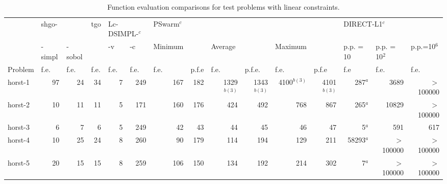 \setlength{\tabcolsep}{5.5pt}
\begin{landscape}
\begin{table}[htbp]
\caption{Function evaluation comparisons for test problems with linear constraints. }%
\begin{tabular}{lrrrrrrrrrrrrrr}
\toprule
 & \multicolumn{1}{l}{shgo-}  & \multicolumn{1}{l}{} & \multicolumn{1}{l}{tgo}  & \multicolumn{2}{l}{Lc-DSIMPL-$^c$}   & \multicolumn{1}{l}{PSwarm$^c$} & \multicolumn{1}{l}{} & \multicolumn{1}{l}{} & \multicolumn{1}{l}{}  & \multicolumn{1}{l}{} & \multicolumn{1}{l}{} & \multicolumn{2}{l}{DIRECT-L1$^c$}  &  \\  \cmidrule(lr){7-12}
 & \multicolumn{1}{l}{-simpl}  & \multicolumn{1}{l}{-sobol} & \multicolumn{1}{l}{}  & \multicolumn{1}{l}{-v} & \multicolumn{1}{l}{-c} & \multicolumn{1}{l}{Minimum} & \multicolumn{1}{l}{} & \multicolumn{1}{l}{Average} & \multicolumn{1}{l}{} & \multicolumn{1}{l}{Maximum} & \multicolumn{1}{l}{} & \multicolumn{1}{l}{p.p. = 10} & \multicolumn{1}{l}{p.p. = 10$^2$} & \multicolumn{1}{l}{p.p.=10$^6$} \\  \cmidrule(lr){2-3} \cmidrule(lr){4-4}  \cmidrule(lr){5-6} \cmidrule(lr){7-8} \cmidrule(lr){9-10} \cmidrule(lr){11-12}  \cmidrule(lr){13-15}
Problem & \multicolumn{1}{l}{f.e.} & \multicolumn{1}{l}{f.e.} & \multicolumn{1}{l}{f.e.} & \multicolumn{1}{l}{f.e.} & \multicolumn{1}{l}{f.e.} & \multicolumn{1}{l}{f.e.} & \multicolumn{1}{l}{p.f.e} & \multicolumn{1}{l}{f.e.} & \multicolumn{1}{l}{p.f.e.} & \multicolumn{1}{l}{f.e.} & \multicolumn{1}{l}{p.f.e} & \multicolumn{1}{l}{f.e} & \multicolumn{1}{l}{f.e.} & \multicolumn{1}{l}{f.e.} \\ 
\midrule
horst-1  & 97 & 24 & 34 & 7 & 249 & 167 & 182 & 1329$^{b(3)}$ & 1343$^{b(3)}$ & 4100$^{b(3)}$ & 4101$^{b(3)}$ & 287$^a$ & 3689 & $>$100000 \\[0.05cm]
horst-2  & 10 & 11 & 11 & 5 & 171 & 160 & 176 & 424 & 492 & 768 & 867 & 265$^a$ & 10829 & $>$100000 \\[0.05cm]
horst-3  & 6 & 7 &  6 & 5 & 249 & 42 & 43 & 44 & 45 & 46 & 47 & 5$^a$ & 591 & 617 \\[0.05cm]
horst-4  & 10 & 25 & 24 & 8 & 260 & 90 & 179 & 114 & 194 & 129 & 211 & 58293$^a$ & $>$100000 & $>$100000 \\[0.05cm]
horst-5  & 20 & 15 & 15 & 8 & 259 & 106 & 150 & 134 & 192 & 214 & 302 & 7$^a$ & $>$100000 & $>$100000 \\[0.05cm]

\end{tabular}
\end{table}
\end{landscape}
